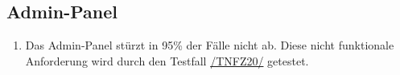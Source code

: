 \subsection*{Admin-Panel}

\begin{samepage}
    \begin{enumerate}[label=\textbf{/NFZ\arabic*0/}, align=left, start=2]
        \item \label{/NFZ20/} Das \Gls{Admin-Panel} stürzt in 95\% der Fälle nicht ab. Diese nicht funktionale Anforderung wird durch den Testfall \hyperref[/TNFZ20/]{/TNFZ20/} getestet.
    \end{enumerate}
\end{samepage}